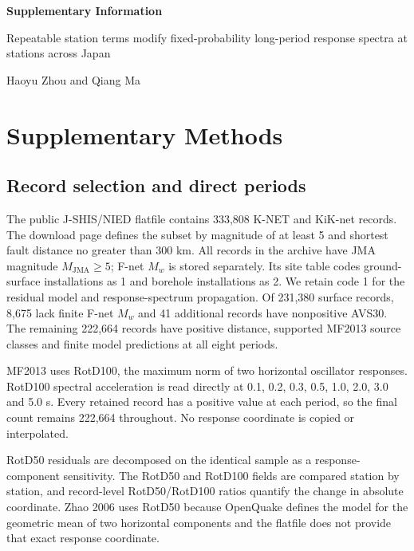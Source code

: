 \documentclass[10pt]{article}
\begin{document}
\renewcommand{\figurename}{Supplementary Figure}
\renewcommand{\tablename}{Supplementary Table}

\begin{center}
{\Large\bfseries Supplementary Information\par}
\vspace{0.5em}
{\large Repeatable station terms modify fixed-probability long-period response spectra at stations across Japan\par}
\vspace{0.5em}
{Haoyu Zhou and Qiang Ma\par}
\end{center}

\section*{Supplementary Methods}

\subsection*{Record selection and direct periods}

The public J-SHIS/NIED  flatfile contains 333,808 K-NET and KiK-net records\cite{niedflatfile,flatfilepage}. The download page defines the subset by magnitude of at least 5 and shortest fault distance no greater than 300 km. All records in the archive have JMA magnitude $M_{\mathrm{JMA}}\geq5$; F-net $M_w$ is stored separately. Its site table codes ground-surface installations as 1 and borehole installations as 2. We retain code 1 for the residual model and response-spectrum propagation. Of 231,380 surface records, 8,675 lack finite F-net $M_w$ and 41 additional records have nonpositive AVS30. The remaining 222,664 records have positive distance, supported MF2013 source classes and finite model predictions at all eight periods.

MF2013 uses RotD100, the maximum norm of two horizontal oscillator responses\cite{dohi2024}. RotD100 spectral acceleration is read directly at 0.1, 0.2, 0.3, 0.5, 1.0, 2.0, 3.0 and 5.0 s. Every retained record has a positive value at each period, so the final count remains 222,664 throughout. No response coordinate is copied or interpolated.

RotD50 residuals are decomposed on the identical sample as a response-component sensitivity. The RotD50 and RotD100 fields are compared station by station, and record-level RotD50/RotD100 ratios quantify the change in absolute coordinate. Zhao 2006 uses RotD50 because OpenQuake defines the model for the geometric mean of two horizontal components and the flatfile does not provide that exact response coordinate.
\end{document}
